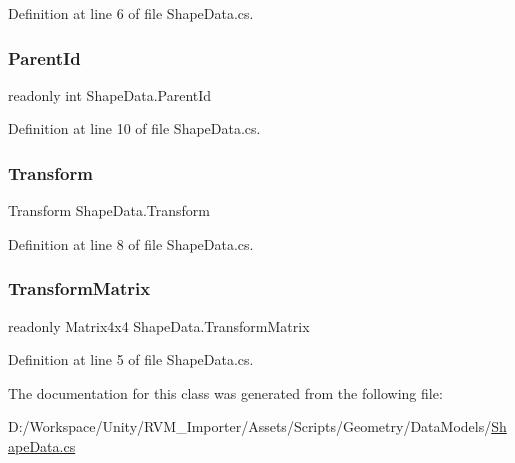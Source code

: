 Definition at line 6 of file Shape\+Data.\+cs.

\mbox{\label{class_shape_data_ad47d3c37921e5c201d948387f79d81e7}} 
\subsubsection{\texorpdfstring{ParentId}{ParentId}}
{\footnotesize\ttfamily readonly int Shape\+Data.\+Parent\+Id}



Definition at line 10 of file Shape\+Data.\+cs.

\mbox{\label{class_shape_data_ac6bdbf9124190bfcd1d32cfb0df712ee}} 
\subsubsection{\texorpdfstring{Transform}{Transform}}
{\footnotesize\ttfamily Transform Shape\+Data.\+Transform}



Definition at line 8 of file Shape\+Data.\+cs.

\mbox{\label{class_shape_data_a604384bb9311f5a3e6eaaa8ac3965919}} 
\subsubsection{\texorpdfstring{TransformMatrix}{TransformMatrix}}
{\footnotesize\ttfamily readonly Matrix4x4 Shape\+Data.\+Transform\+Matrix}



Definition at line 5 of file Shape\+Data.\+cs.



The documentation for this class was generated from the following file\+:\begin{DoxyCompactItemize}
\item 
D\+:/\+Workspace/\+Unity/\+R\+V\+M\+\_\+\+Importer/\+Assets/\+Scripts/\+Geometry/\+Data\+Models/\mbox{\hyperlink{_shape_data_8cs}{Shape\+Data.\+cs}}\end{DoxyCompactItemize}
